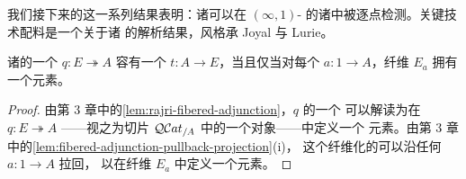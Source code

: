 我们接下来的这一系列结果表明：诸\trUniversalProperty{}可以在 $(\infty,1)$-%
\trCategory{}的诸\trInfinityCosmos{}中被逐点检测。关键技术配料是一个关于诸%
\trQuasiCategory{}的解析结果，风格承 Joyal 与 Lurie。

\begin{proposition}\label{prop:cocartesian-rari-terminal-elements}
诸\trQuasiCategory{}的一个\trCocartesianFibration{}
$q\colon E\twoheadrightarrow A$ 容有一个\trRightAdjoint\trRightInverse{}
$t\colon A\to E$，当且仅当对每个\trElement{} $a\colon 1\to A$，纤维 $E_{a}$
拥有一个\trTerminal{}元素。
\end{proposition}

\begin{proof}
由第 3 章中的\cref{lem:rajri-fibered-adjunction}，$q$ 的一个%
\trRightAdjoint\trRightInverse{}可以解读为在 $q\colon E\twoheadrightarrow A$
——视之为切片\trInfinityCosmos{} $\mathcal{Q}\mathcal{C}at_{/A}$ 中的一个对象——中定义一个%
\trTerminal{}元素。由第 3 章中的\cref{lem:fibered-adjunction-pullback-projection}(i)，
这个纤维化的\trAdjunction{}可以沿任何\trElement{} $a\colon 1\to A$ 拉回，
以在纤维 $E_{a}$ 中定义一个\trTerminal{}元素。


\end{proof}
